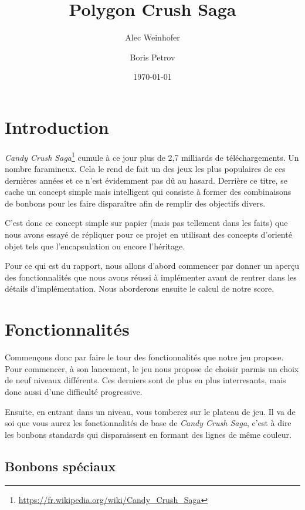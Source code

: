 \documentclass[11pt,a4paper]{article}
\title{Polygon Crush Saga}
\author{Alec Weinhofer \and Boris Petrov}
\date{\today}
\begin{document}
\maketitle
\tableofcontents


\section{Introduction}

\emph{Candy Crush Saga}\footnote{\url{https://fr.wikipedia.org/wiki/Candy_Crush_Saga}}
cumule à ce jour plus de 2,7 milliards de
téléchargements. Un nombre faramineux. Cela le rend de fait
un des jeux les plus populaires de ces dernières années et
ce n'est évidemment pas dû au hasard. Derrière ce titre, se
cache un concept simple mais intelligent qui consiste à
former des combinaisons de bonbons pour les faire
disparaître afin de remplir des objectifs divers.

C'est donc ce concept simple sur papier (mais pas tellement
dans les faits) que nous avons essayé de répliquer pour ce
projet en utilisant des concepts d'orienté objet tels que
l'encapsulation ou encore l'héritage.

Pour ce qui est du rapport, nous allons d'abord commencer par donner un aperçu des
fonctionnalités que nous avons réussi à implémenter avant de
rentrer dans les détails d'implémentation.
Nous aborderons ensuite le calcul de notre score.

\section{Fonctionnalités}

Commençons donc par faire le tour des fonctionnalités que notre jeu propose.
Pour commencer, à son lancement, le jeu nous propose de choisir parmis un choix de neuf niveaux différents.
Ces derniers sont de plus en plus interresants, mais donc aussi d'une difficulté progressive.

Ensuite, en entrant dans un niveau, vous tomberez sur le plateau de jeu. 
Il va de soi que vous aurez les fonctionnalités de base de \emph{Candy Crush Saga}, 
c'est à dire les bonbons standards qui disparaissent en formant des lignes de même couleur.

\subsection{Bonbons spéciaux}
\end{document}
